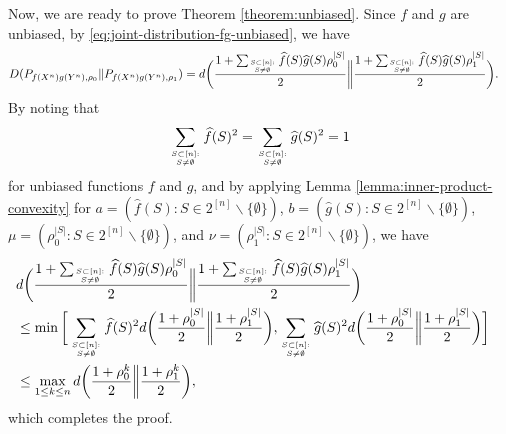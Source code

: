 \documentclass[journal,draftcls, onecolumn]{IEEEtran}
\newcommand{\qed}{\hfill \IEEEQED}
\begin{document}
Now, we are ready to prove Theorem \ref{theorem:unbiased}. Since $f$ and $g$ are unbiased, by \eqref{eq:joint-distribution-fg-unbiased}, we have
\begin{align*}
D(P_{f(X^n)g(Y^n),\rho_0} \| P_{f(X^n)g(Y^n),\rho_1})
&= d\bigg( \frac{1+ \sum_{S\subset [n]:\atop S \neq \emptyset}  \widehat{f}(S) \widehat{g}(S) \rho_0^{|S|}}{2} \bigg\| 
  \frac{1 + \sum_{S \subset [n]: \atop S \neq \emptyset}  \widehat{f}(S) \widehat{g}(S) \rho_1^{|S|}}{2} \bigg).
\end{align*}
By noting that
\begin{align*}
\sum_{S \subset [n]: \atop S \neq \emptyset} \widehat{f}(S)^2 = \sum_{S \subset [n]: \atop S \neq \emptyset} \widehat{g}(S)^2 = 1
\end{align*}
for unbiased functions $f$ and $g$, and 
by applying Lemma \ref{lemma:inner-product-convexity} for $a = (\widehat{f}(S): S \in 2^{[n]}\backslash\{\emptyset\})$,
$b= (\widehat{g}(S): S \in 2^{[n]}\backslash\{\emptyset\})$, $\mu = (\rho_0^{|S|}: S \in 2^{[n]}\backslash\{\emptyset\})$,
and $\nu=(\rho_1^{|S|}: S \in 2^{[n]}\backslash\{\emptyset\})$, we have
\begin{align}
\lefteqn{ d\bigg( \frac{1+ \sum_{S\subset [n]:\atop S \neq \emptyset}  \widehat{f}(S) \widehat{g}(S) \rho_0^{|S|}}{2} \bigg\| 
  \frac{1 + \sum_{S \subset [n]: \atop S \neq \emptyset}  \widehat{f}(S) \widehat{g}(S) \rho_1^{|S|}}{2} \bigg) } \\
  &\le \min\bigg[
  \sum_{S \subset [n]: \atop S \neq \emptyset} \widehat{f}(S)^2 d\bigg( \frac{1+\rho_0^{|S|}}{2} \bigg\| \frac{1+\rho_1^{|S|}}{2} \bigg),
  \sum_{S \subset [n]: \atop S \neq \emptyset} \widehat{g}(S)^2 d\bigg( \frac{1+\rho_0^{|S|}}{2} \bigg\| \frac{1+\rho_1^{|S|}}{2} \bigg)
  \bigg] \label{eq:min-joint-convexity-bound} \\
  &\le \max_{1\le k \le n} d\bigg( \frac{1+\rho_0^k}{2} \bigg\| \frac{1+\rho_1^k}{2} \bigg),
\end{align}
which completes the proof. \qed
\end{document}
